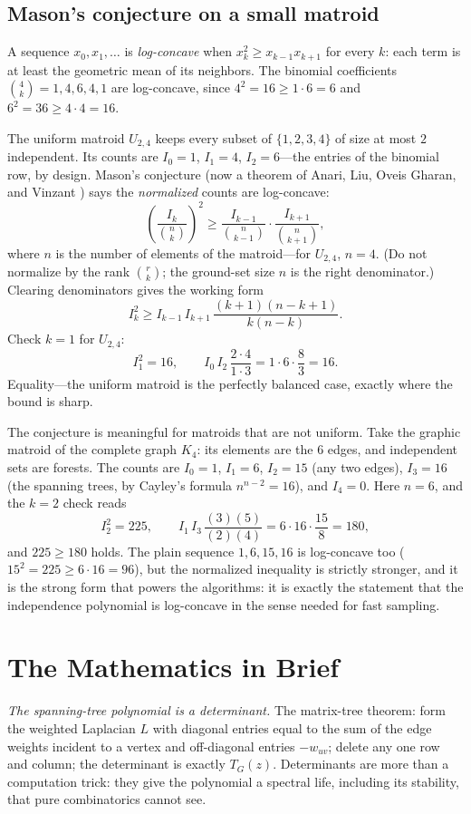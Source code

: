 \subsection{Mason's conjecture on a small matroid}
A sequence $x_0,x_1,\ldots$ is \emph{log-concave} when $x_k^2\ge x_{k-1}x_{k+1}$ for every $k$: each term is at least the geometric mean of its neighbors. The binomial coefficients $\binom 4k=1,4,6,4,1$ are log-concave, since $4^2=16\ge 1\cdot 6=6$ and $6^2=36\ge 4\cdot 4=16$.

The uniform matroid $U_{2,4}$ keeps every subset of $\{1,2,3,4\}$ of size at most $2$ independent. Its counts are $I_0=1$, $I_1=4$, $I_2=6$---the entries of the binomial row, by design. Mason's conjecture (now a theorem of Anari, Liu, Oveis Gharan, and Vinzant \cite{anari20}) says the \emph{normalized} counts are log-concave:
\[
\left(\frac{I_k}{\binom nk}\right)^2\ge \frac{I_{k-1}}{\binom n{k-1}}\cdot\frac{I_{k+1}}{\binom n{k+1}},
\]
where $n$ is the number of elements of the matroid---for $U_{2,4}$, $n=4$. (Do not normalize by the rank $\binom rk$; the ground-set size $n$ is the right denominator.) Clearing denominators gives the working form
\[
I_k^2\ge I_{k-1}\,I_{k+1}\,\frac{(k+1)(n-k+1)}{k(n-k)}.
\]
Check $k=1$ for $U_{2,4}$:
\[
I_1^2=16,\qquad I_0\,I_2\,\frac{2\cdot 4}{1\cdot 3}=1\cdot 6\cdot\frac{8}{3}=16.
\]
Equality---the uniform matroid is the perfectly balanced case, exactly where the bound is sharp.

The conjecture is meaningful for matroids that are not uniform. Take the graphic matroid of the complete graph $K_4$: its elements are the $6$ edges, and independent sets are forests. The counts are $I_0=1$, $I_1=6$, $I_2=15$ (any two edges), $I_3=16$ (the spanning trees, by Cayley's formula $n^{n-2}=16$), and $I_4=0$. Here $n=6$, and the $k=2$ check reads
\[
I_2^2=225,\qquad I_1\,I_3\,\frac{(3)(5)}{(2)(4)}=6\cdot 16\cdot\frac{15}{8}=180,
\]
and $225\ge 180$ holds. The plain sequence $1,6,15,16$ is log-concave too ($15^2=225\ge 6\cdot 16=96$), but the normalized inequality is strictly stronger, and it is the strong form that powers the algorithms: it is exactly the statement that the independence polynomial is log-concave in the sense needed for fast sampling.

\section{The Mathematics in Brief}
\emph{The spanning-tree polynomial is a determinant.} The matrix-tree theorem: form the weighted Laplacian $L$ with diagonal entries equal to the sum of the edge weights incident to a vertex and off-diagonal entries $-w_{uv}$; delete any one row and column; the determinant is exactly $T_G(z)$. Determinants are more than a computation trick: they give the polynomial a spectral life, including its stability, that pure combinatorics cannot see.

